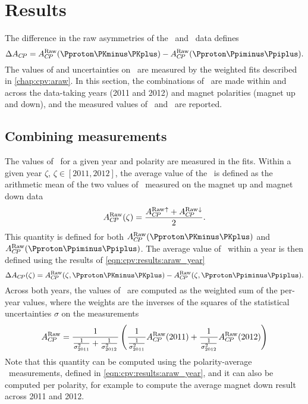 \chapter{Results}
\label{chap:cpv:results}

The difference in the raw asymmetries of the \pKK\ and \ppipi\ data defines 
\dACP
\begin{equation*}
  \dACP = \ARaw(\pKK) - \ARaw(\ppipi).
\end{equation*}
The values of and uncertainties on \ARaw\ are measured by the weighted fits 
described in \cref{chap:cpv:araw}.
In this section, the combinations of \ARaw\ are made within and across the 
data-taking years (2011 and 2012) and magnet polarities (magnet up and down), 
and the measured values of \ARaw\ and \dACP\ are reported.

\section{Combining measurements}
\label{chap:cpv:results:combination}

The values of \ARaw\ for a given year and polarity are measured in the fits.
Within a given year $\zeta$, $\zeta \in [2011, 2012]$, the average value of the 
\ARaw\ is defined as the arithmetic mean of the two values of \ARaw\ measured 
on the magnet up and magnet down data
\begin{equation}
  \ARaw(\zeta) = \frac{%
    \ARaw{}^{\uparrow} + \ARaw{}^{\downarrow}
  }{%
    2
  }.
  \label{eqn:cpv:results:araw_year}
\end{equation}
This quantity is defined for both $\ARaw(\pKK)$ and $\ARaw(\ppipi)$.
The average value of \dACP\ within a year is then defined using the results of 
\cref{eqn:cpv:results:araw_year}
\begin{equation}
  \dACP(\zeta) = \ARaw(\zeta, \pKK) - \ARaw(\zeta, \ppipi).
\end{equation}
Across both years, the values of \ARaw\ are computed as the weighted sum of the 
per-year values, where the weights are the inverses of the squares of the 
statistical uncertainties $\sigma$ on the measurements
\begin{equation}
  A_{C\!P}^{\textnormal{Raw}} =
    \frac{1}{\frac{1}{\sigma_{2011}^{2}} + \frac{1}{\sigma_{2012}^{2}}}
    \left(
      \frac{1}{\frac{1}{\sigma_{2011}^{2}}}A_{C\!P}^{\textnormal{Raw}}(2011) +
      \frac{1}{\frac{1}{\sigma_{2012}^{2}}}A_{C\!P}^{\textnormal{Raw}}(2012)
    \right)
  \label{eqn:cpv:results:araw_polarity}
\end{equation}
Note that this quantity can be computed using the polarity-average \ARaw\ 
measurements, defined in \cref{eqn:cpv:results:araw_year}, and it can also be 
computed per polarity, for example to compute the average magnet down result 
across 2011 and 2012.

